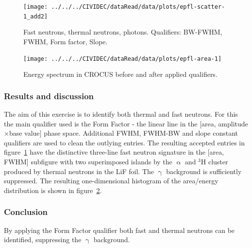 \begin{figure}[]
\centering
\texttt{[image: ../../../CIVIDEC/dataRead/data/plots/epfl-scatter-1\_add2]}
\caption{Fast neutrons, thermal neutrons, photons. Qualifiers: BW-FWHM, FWHM, Form factor, Slope.}
\label{fig:scatterepfl2}
\end{figure}

\begin{figure}[]
\centering
\texttt{[image: ../../../CIVIDEC/dataRead/data/plots/epfl-area-1]}
\caption{Energy spectrum in CROCUS before and after applied qualifiers.}
\label{fig:scatterepfl2area}
\end{figure}


\subsubsection{Results and discussion}
The aim of this exercise is to identify both thermal and fast neutrons. For this the main qualifier used is the Form Factor - the linear line in the [area, amplitude$\times$base value] phase space. Additional FWHM, FWHM-BW and slope constant qualifiers are used to clean the outlying entries. The resulting accepted entries in figure~\ref{fig:scatterepfl2} have the distinctive three-line fast neutron signature in the [area, FWHM] subfigure with two superimposed islands by the $\upalpha$ and $^3$H cluster produced by thermal neutrons in the LiF foil. The $\upgamma$ background is sufficiently suppressed. The resulting one-dimensional histogram of the area/energy distribution is shown in figure~\ref{fig:scatterepfl2area}.

\subsubsection{Conclusion}
By applying the Form Factor qualifier both fast and thermal neutrons can be identified, suppressing the $\upgamma$ background.



